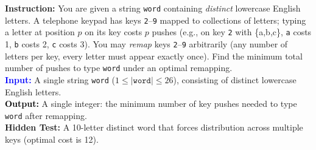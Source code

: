 \documentclass[11pt]{article}
\theoremstyle{definition}
\theoremstyle{remark}
\begin{document}
\begin{tcolorbox}[colback=bg,
title=\textbf{Question and Hidden Test in LeetCode}]
\begin{flushleft}
\textcolor{softblue}{\textbf{Instruction:}} You are given a string \texttt{word} containing \emph{distinct} lowercase English letters. A telephone keypad has keys \texttt{2}--\texttt{9} mapped to collections of letters; typing a letter at position $p$ on its key costs $p$ pushes (e.g., on key \texttt{2} with \{a,b,c\}, \texttt{a} costs 1, \texttt{b} costs 2, \texttt{c} costs 3). You may \emph{remap} keys \texttt{2}--\texttt{9} arbitrarily (any number of letters per key, every letter must appear exactly once). Find the minimum total number of pushes to type \texttt{word} under an optimal remapping.\\[4pt]

\textcolor{blue}{\textbf{Input:}} A single string \texttt{word} ($1 \le |{\texttt{word}}| \le 26$), consisting of distinct lowercase English letters.\\[2pt]

\textcolor{Black}{\textbf{Output:}} A single integer: the minimum number of key pushes needed to type \texttt{word} after remapping.\\[6pt]

{\textbf{Hidden Test:}} A 10-letter distinct word that forces distribution across multiple keys (optimal cost is 12).\\
\end{flushleft}
\end{tcolorbox}
\end{document}
